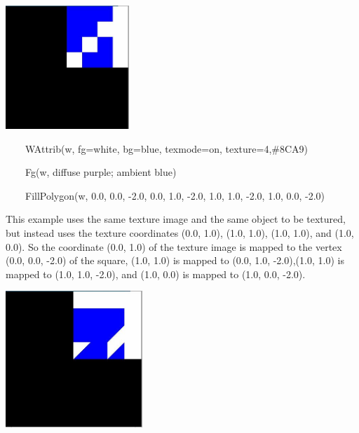\documentclass[letterpaper]{article}
\begin{document}
{\bigskip

{\centering  \includegraphics[width=1.8335in,height=1.8335in]{utr9/utr9-img030.jpg} \par}

\bigskip


\bigskip

{\sffamily
\ \ \ \ WAttrib(w, {\textquotedbl}fg=white{\textquotedbl}, {\textquotedbl}bg=blue{\textquotedbl},
{\textquotedbl}texmode=on{\textquotedbl}, {\textquotedbl}texture=4,\#8CA9{\textquotedbl})}

{\sffamily
\ \ \ \ Fg(w, {\textquotedbl}diffuse purple; ambient blue{\textquotedbl})}

{\sffamily
\ \ \ \ FillPolygon(w, 0.0, 0.0, -2.0, 0.0, 1.0, -2.0, 1.0, 1.0, -2.0, 1.0, 0.0, -2.0) }


\bigskip

This example uses the same texture image and the same object to be
textured, but instead uses the texture coordinates
\textsf{(0.0, 1.0)},\textsf{ (1.0, 1.0)},
\textsf{ (1.0, 1.0)}, and \textsf{(1.0, 0.0)}. So the
coordinate \textsf{(0.0, 1.0) }of the texture image is mapped to the
vertex \textsf{(0.0, 0.0, -2.0)} of the square, \textsf{(1.0, 1.0)}
is mapped to \textsf{(0.0, 1.0, -2.0),(1.0, 1.0)} is
mapped to \textsf{(1.0, 1.0, -2.0)}, and \textsf{(1.0}, \textsf{0.0)}
is mapped to \textsf{(1.0, 0.0, -2.0)}.


\bigskip

{\centering  \includegraphics[width=2.0307in,height=2.0311in]{utr9/utr9-img031.jpg} \par}

}
\end{document}
